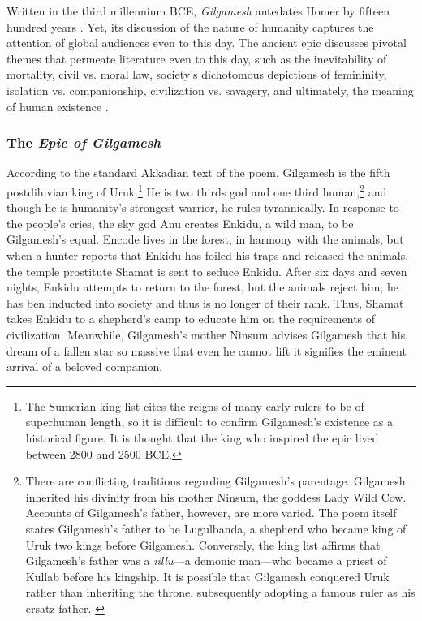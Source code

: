 \documentclass[10pt,a4paper]{article}
\begin{document}
Written in the third millennium BCE, \emph{Gilgamesh} antedates Homer by fifteen hundred years \cite{sandars1972epic}. Yet, its discussion of the nature of humanity captures the attention of global audiences even to this day. The ancient epic discusses pivotal themes that permeate literature even to this day, such as the inevitability of mortality, civil vs. moral law, society’s dichotomous depictions of femininity, isolation vs. companionship, civilization vs. savagery, and ultimately, the meaning of human existence \cite{snigowski2015}.

%
%
\subsubsection{The \emph{Epic of Gilgamesh}}

According to the standard Akkadian text of the poem, Gilgamesh is the fifth postdiluvian king of Uruk.\footnote{The Sumerian king list cites the reigns of many early rulers to be of superhuman length, so it is difficult to confirm Gilgamesh’s existence as a historical figure. It is thought that the king who inspired the epic lived between 2800 and 2500 BCE.\cite{dalley2000myths}} He is two thirds god and one third human,\footnote{There are conflicting traditions regarding Gilgamesh’s parentage. Gilgamesh inherited his divinity from his mother Ninsum, the goddess Lady Wild Cow. Accounts of Gilgamesh’s father, however, are more varied. The poem itself states Gilgamesh’s father to be Lugulbanda, a shepherd who became king of Uruk two kings before Gilgamesh. Conversely, the king list affirms that Gilgamesh’s father was a \emph{iillu}—a demonic man—who became a priest of Kullab before his kingship. It is possible that Gilgamesh conquered Uruk rather than inheriting the throne, subsequently adopting a famous ruler as his ersatz father. \cite{dalley2000myths}} and though he is humanity’s strongest warrior, he rules tyrannically. In response to the people’s cries, the sky god Anu creates Enkidu, a wild man, to be Gilgamesh’s equal. Encode lives in the forest, in harmony with the animals, but when a hunter reports that Enkidu has foiled his traps and released the animals, the temple prostitute Shamat is sent to seduce Enkidu. After six days and seven nights, Enkidu attempts to return to the forest, but the animals reject him; he has ben inducted into society and thus is no longer of their rank. Thus, Shamat takes Enkidu to a shepherd’s camp to educate him on the requirements of civilization. Meanwhile, Gilgamesh’s mother Ninsum advises Gilgamesh that his dream of a fallen star so massive that even he cannot lift it signifies the eminent arrival of a beloved companion.
\end{document}
